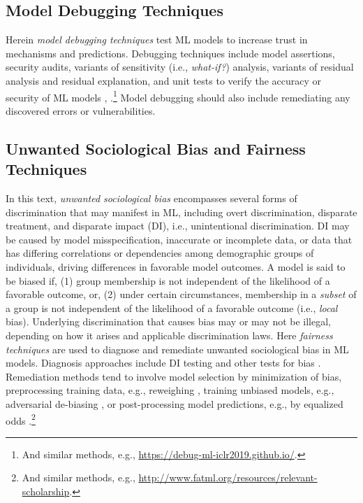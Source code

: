 \documentclass{article}
\begin{document}
\subsection{Model Debugging Techniques}

Herein \textit{model debugging techniques} test ML models to increase trust in mechanisms and predictions. Debugging techniques include model assertions, security audits, variants of sensitivity (i.e., \textit{what-if?}) analysis, variants of residual analysis and residual explanation, and unit tests to verify the accuracy or security of ML models \cite{modeltracker}, \cite{kangdebugging}.\footnote{And similar methods, e.g., \url{https://debug-ml-iclr2019.github.io/}.} Model debugging should also include remediating any discovered errors or vulnerabilities.

\subsection{Unwanted Sociological Bias and Fairness Techniques}

In this text, \textit{unwanted sociological bias} encompasses several forms of discrimination that may manifest in ML, including overt discrimination, disparate treatment, and disparate impact (DI), i.e., unintentional discrimination. DI may be caused by model misspecification, inaccurate or incomplete data, or data that has differing correlations or dependencies among demographic groups of individuals, driving differences in favorable model outcomes. A model is said to be biased if, (1) group membership is not independent of the likelihood of a favorable outcome, or, (2) under certain circumstances, membership in a \textit{subset} of a group is not independent of the likelihood of a favorable outcome (i.e., \textit{local} bias). Underlying discrimination that causes bias may or may not be illegal, depending on how it arises and applicable discrimination laws. Here \textit{fairness techniques} are used to diagnose and remediate unwanted sociological bias in ML models. Diagnosis approaches include DI testing and other tests for bias \cite{feldman2015certifying}. Remediation methods tend to involve model selection by minimization of bias, preprocessing training data, e.g., reweighing \cite{kamiran2012data}, training unbiased models, e.g., adversarial de-biasing \cite{zhang2018mitigating}, or post-processing model predictions, e.g., by equalized odds \cite{hardt2016equality}.\footnote{And similar methods, e.g., \url{http://www.fatml.org/resources/relevant-scholarship}.} 
\end{document}
